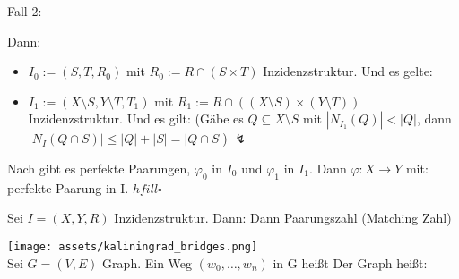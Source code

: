 \documentclass{../../meta/tudscript}
\begin{document}
    \setcounter{section}{13}    \setcounter{subsection}{19}

    Fall 2: 
    
    Dann: 
    \begin{itemize}
        \item $I_0 := (S, T, R_0)$ mit $R_0 := R \cap (S \times T)$ Inzidenzstruktur. Und es gelte:
        \item $I_1 := (X \setminus S, Y \setminus T, T_1)$ mit $R_1 := R \cap ((X \setminus S) \times (Y \setminus T))$ Inzidenzstruktur. Und es gilt:
    (Gäbe es $Q \subseteq X \setminus S$ mit $|N_{I_1} (Q)| < |Q|$, dann $|N_I (Q \cap S)| \leq |Q| + |S| = |Q \cap S|$) $\lightning$
    \end{itemize}
    
Nach  gibt es perfekte Paarungen, $\varphi_0$ in $I_0$ und $\varphi_1$ in $I_1$.
Dann $\varphi: X \rightarrow Y$ mit:
perfekte Paarung in I. $hfill\square$

Sei $I = (X, Y , R)$ Inzidenzstruktur. Dann:
    Dann Paarungszahl (Matching Zahl)
     
\texttt{[image: assets/kaliningrad\_bridges.png]} \\

Sei $G = (V, E)$ Graph. Ein Weg $(w_0, \ldots, w_n)$ in G heißt
        Der Graph heißt:
        
\end{document}
